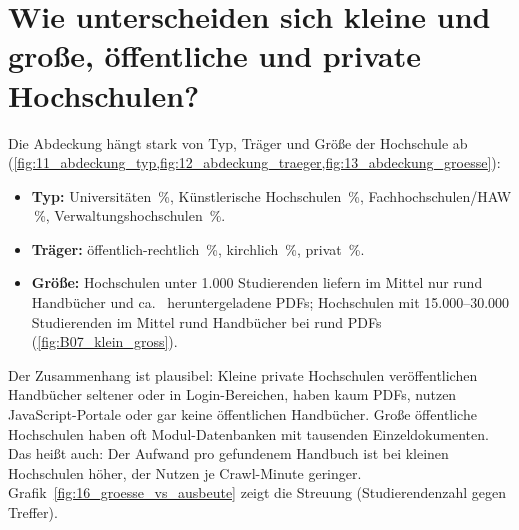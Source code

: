 \section{Wie unterscheiden sich kleine und große, öffentliche und private Hochschulen?}
Die Abdeckung hängt stark von Typ, Träger und Größe der Hochschule ab (\cref{fig:11_abdeckung_typ,fig:12_abdeckung_traeger,fig:13_abdeckung_groesse}):
\begin{itemize}
  \item \textbf{Typ:} Universitäten \zCovUni\,\%, Künstlerische Hochschulen \zCovKunst\,\%, Fachhochschulen/HAW \zCovFH\,\%, Verwaltungshochschulen \zCovVerw\,\%.
  \item \textbf{Träger:} öffentlich-rechtlich \zCovOeff\,\%, kirchlich \zCovKirch\,\%, privat \zCovPriv\,\%.
  \item \textbf{Größe:} Hochschulen unter 1.000 Studierenden liefern im Mittel nur rund \zMHProUniKlein{} Handbücher und ca.\ \zDocsProUniKlein{} heruntergeladene PDFs; Hochschulen mit 15.000--30.000 Studierenden im Mittel rund \zMHProUniGross{} Handbücher bei rund \zDocsProUniGross{} PDFs (\cref{fig:B07_klein_gross}).
\end{itemize}
Der Zusammenhang ist plausibel: Kleine private Hochschulen veröffentlichen Handbücher seltener oder in Login-Bereichen, haben kaum PDFs, nutzen JavaScript-Portale oder gar keine öffentlichen Handbücher. Große öffentliche Hochschulen haben oft Modul-Datenbanken mit tausenden Einzeldokumenten. Das heißt auch: Der Aufwand pro gefundenem Handbuch ist bei kleinen Hochschulen höher, der Nutzen je Crawl-Minute geringer. Grafik~\ref{fig:16_groesse_vs_ausbeute} zeigt die Streuung (Studierendenzahl gegen Treffer).


